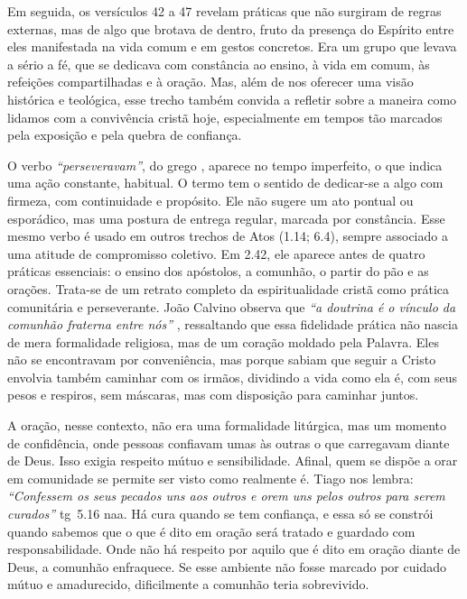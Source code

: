 Em seguida, os versículos 42 a 47 revelam práticas que não surgiram de regras externas, mas de algo que brotava de dentro, fruto da presença do Espírito entre eles manifestada na vida comum e em gestos concretos. Era um grupo que levava a sério a fé, que se dedicava com constância ao ensino, à vida em comum, às refeições compartilhadas e à oração. Mas, além de nos oferecer uma visão histórica e teológica, esse trecho também convida a refletir sobre a maneira como lidamos com a convivência cristã hoje, especialmente em tempos tão marcados pela exposição e pela quebra de confiança.

O verbo \textit{``perseveravam''}, do grego \textit{}, aparece no tempo imperfeito, o que indica uma ação constante, habitual. O termo tem o sentido de dedicar-se a algo com firmeza, com continuidade e propósito. Ele não sugere um ato pontual ou esporádico, mas uma postura de entrega regular, marcada por constância. Esse mesmo verbo é usado em outros trechos de Atos (1.14; 6.4), sempre associado a uma atitude de compromisso coletivo. Em 2.42, ele aparece antes de quatro práticas essenciais: o ensino dos apóstolos, a comunhão, o partir do pão e as orações. Trata-se de um retrato completo da espiritualidade cristã como prática comunitária e perseverante. João Calvino observa que \textit{``a doutrina é o vínculo da comunhão fraterna entre nós''} \cite{calvinoAtos2}, ressaltando que essa fidelidade prática não nascia de mera formalidade religiosa, mas de um coração moldado pela Palavra. Eles não se encontravam por conveniência, mas porque sabiam que seguir a Cristo envolvia também caminhar com os irmãos, dividindo a vida como ela é, com seus pesos e respiros, sem máscaras, mas com disposição para caminhar juntos.

A oração, nesse contexto, não era uma formalidade litúrgica, mas um momento de confidência, onde pessoas confiavam umas às outras o que carregavam diante de Deus. Isso exigia respeito mútuo e sensibilidade. Afinal, quem se dispõe a orar em comunidade se permite ser visto como realmente é. Tiago nos lembra: \textit{``Confessem os seus pecados uns aos outros e orem uns pelos outros para serem curados''} \gls{tg}~5.16 \gls{naa}. Há cura quando se tem confiança, e essa só se constrói quando sabemos que o que é dito em oração será tratado e guardado com responsabilidade. Onde não há respeito por aquilo que é dito em oração diante de Deus, a comunhão enfraquece. Se esse ambiente não fosse marcado por cuidado mútuo e amadurecido, dificilmente a comunhão teria sobrevivido.

